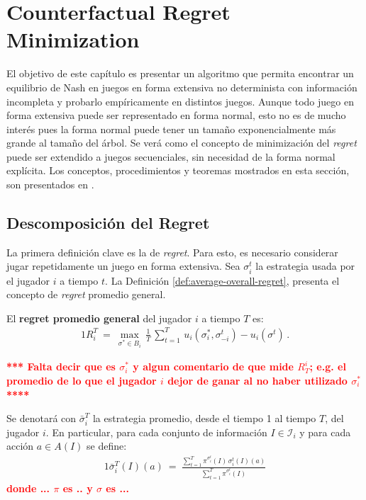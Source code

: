 \chapter{Counterfactual Regret Minimization}
\label{chapter:cfr}

El objetivo de este capítulo es presentar un algoritmo que permita encontrar un equilibrio de Nash en juegos en forma extensiva no determinista con información incompleta y probarlo empíricamente en distintos juegos. Aunque todo juego en forma extensiva puede ser representado en forma normal, esto no es de mucho interés pues la forma normal puede tener un tamaño exponencialmente más grande al tamaño del árbol. Se verá como el concepto de minimización del \textit{regret} puede ser extendido a juegos secuenciales, sin necesidad de la forma normal explícita. Los conceptos, procedimientos y teoremas mostrados en esta sección, son presentados en \cite{bib:cfr}.

\section{Descomposición del Regret}

La primera definición clave es la de \textit{regret}. Para esto, es necesario considerar jugar repetidamente un juego en forma extensiva. Sea $\sigma_i^t$ la estrategia usada por el jugador $i$ a tiempo $t$. La Definición \ref{def:average-overall-regret}, presenta el concepto de \textit{regret} promedio general.

\begin{definition}
\label{def:average-overall-regret}
El \textbf{regret promedio general} del jugador $i$ a tiempo $T$ es:
\begin{alignat}{1}
R_i^T\ =\ \max_{\sigma^* \in B_i} \, \frac{1}{T}\, \sum_{t = 1}^T \, u_i(\sigma_i^*, \sigma_{-i}^t) - u_i(\sigma^t) \,.
\end{alignat}
\end{definition}

\textcolor{red}{\bf **** Falta decir que es $\sigma_i^*$ y algun comentario de que mide $R^i_T$; e.g. el promedio de lo que el jugador $i$ dejor de ganar al no haber utilizado $\sigma_i^*$ ****}

Se denotará con $\bar{\sigma}_i^{T}$ la estrategia promedio, desde el tiempo 1 al tiempo $T$, del jugador $i$. En particular, para cada conjunto de información $I \in \mathcal{I}_i$ y para cada acción $a \in A(I)$ se define:
\begin{alignat}{1}
\bar{\sigma}_i^{T}(I)(a)\ =\ \frac{\sum_{t = 1}^T \pi^{\sigma^t_i}(I)\,\sigma^t_i(I)(a)}{\sum_{t = 1}^T \pi^{\sigma_i^t}(I)}
\end{alignat}
\textcolor{red}{\bf donde ... $\pi$ es .. y $\sigma$ es ...}

